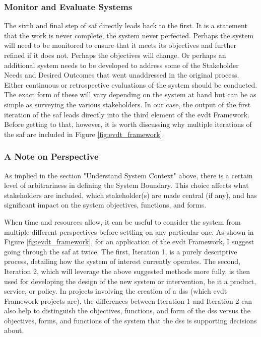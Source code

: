 \subsubsection{Monitor and Evaluate Systems}

The sixth and final step of \ac{saf} directly leads back to the first. It is a statement that the work is never complete, the system never perfected. Perhaps the system will need to be monitored to ensure that it meets its objectives and further refined if it does not. Perhaps the objectives will change. Or perhaps an additional system needs to be developed to address some of the Stakeholder Needs and Desired Outcomes that went unaddressed in the original process. Either continuous or retrospective evaluations of the system should be conducted. The exact form of these will vary depending on the system at hand but can be as simple as surveying the various stakeholders. In our case, the output of the first iteration of the \ac{saf} leads directly into the third element of the \ac{evdt} Framework. Before getting to that, however, it is worth discussing why multiple iterations of the \ac{saf} are included in Figure \ref{fig:evdt_framework}.

\subsubsection{A Note on Perspective}

As implied in the section "Understand System Context" above, there is a certain level of arbitrariness in defining the System Boundary. This choice affects what stakeholders are included, which stakeholder(s) are made central (if any), and has significant impact on the system objectives, functions, and forms.

When time and resources allow, it can be useful to consider the system from multiple different perspectives before settling on any particular one. As shown in Figure \ref{fig:evdt_framework}, for an application of the \ac{evdt} Framework, I suggest going through the \ac{saf} at twice. The first, Iteration 1, is a purely descriptive process, detailing how the system of interest currently operates.  The second, Iteration 2, which will leverage the above suggested methods more fully, is then used for developing the design of the new system or intervention, be it a product, service, or policy. In projects involving the creation of a \ac{dss} (which \ac{evdt} Framework projects are), the differences between Iteration 1 and Iteration 2 can also help to distinguish the objectives, functions, and form of the \ac{dss} versus the objectives, forms, and functions of the system that the \ac{dss} is supporting decisions about.

